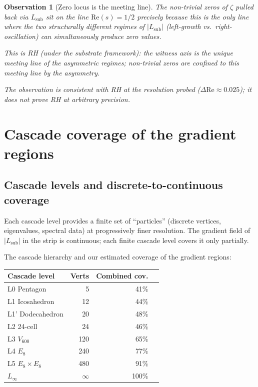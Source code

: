 \documentclass[11pt,a4paper]{article}
\newtheorem{observation}[theorem]{Observation}
\newcommand{\Vsix}{V_{600}}
\newcommand{\Lsub}{L_{\mathrm{sub}}}
\begin{document}
\begin{observation}[Zero locus is the meeting line]
\label{obs:meeting-line}
The non-trivial zeros of $\zeta$ pulled back via $\Lsub$ sit on
the line $\mathrm{Re}(s) = 1/2$ precisely because this is the
\emph{only} line where the two structurally different regimes of
$|\Lsub|$ (left-growth vs.\ right-oscillation) can simultaneously
produce zero values.

This is RH (under the substrate framework): the witness axis is
the unique meeting line of the asymmetric regimes; non-trivial
zeros are confined to this meeting line by the asymmetry.

The observation is consistent with RH at the resolution probed
($\Delta \mathrm{Re} \approx 0.025$); it does not prove RH at
arbitrary precision.
\end{observation}

\section{Cascade coverage of the gradient regions}
\label{sec:cascade}

\subsection{Cascade levels and discrete-to-continuous coverage}

Each cascade level provides a finite set of ``particles''
(discrete vertices, eigenvalues, spectral data) at progressively
finer resolution. The gradient field of $|\Lsub|$ in the strip is
continuous; each finite cascade level covers it only partially.

The cascade hierarchy and our estimated coverage of the gradient
regions:

\begin{center}
\begin{tabular}{lrrr}
\toprule
\textbf{Cascade level} & \textbf{Verts} & \textbf{Combined cov.} \\
\midrule
L0  Pentagon         & 5    & 41\% \\
L1  Icosahedron      & 12   & 44\% \\
L1' Dodecahedron     & 20   & 48\% \\
L2  24-cell          & 24   & 46\% \\
L3  $\Vsix$          & 120  & 65\% \\
L4  $E_8$            & 240  & 77\% \\
L5  $E_8 \times E_8$ & 480  & 91\% \\
$L_\infty$           & $\infty$ & 100\% \\
\bottomrule
\end{tabular}
\end{center}
\end{document}
